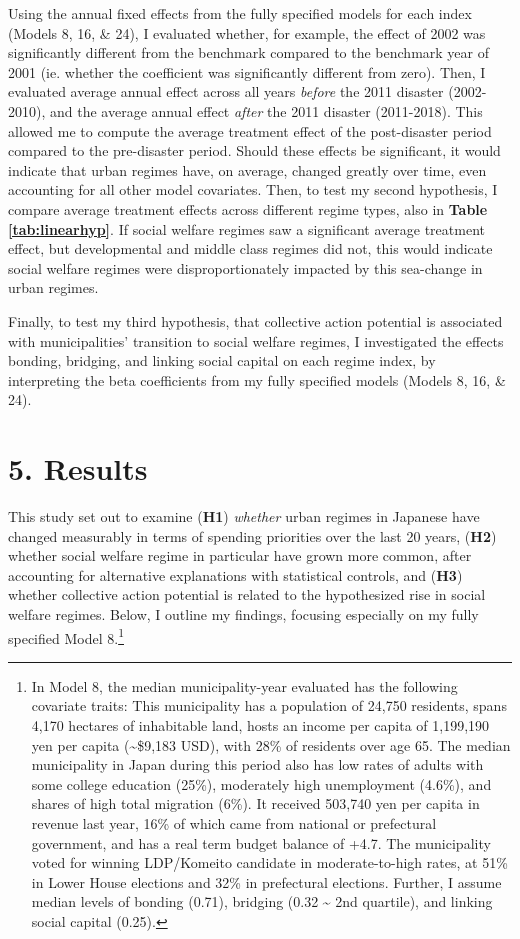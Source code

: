 \documentclass[preprint, 3p,
authoryear]{elsarticle} %
\begin{document}
Using the annual fixed effects from the fully specified models for each
index (Models 8, 16, \& 24), I evaluated whether, for example, the
effect of 2002 was significantly different from the benchmark compared
to the benchmark year of 2001 (ie. whether the coefficient was
significantly different from zero). Then, I evaluated average annual
effect across all years \emph{before} the 2011 disaster (2002-2010), and
the average annual effect \emph{after} the 2011 disaster (2011-2018).
This allowed me to compute the average treatment effect of the
post-disaster period compared to the pre-disaster period. Should these
effects be significant, it would indicate that urban regimes have, on
average, changed greatly over time, even accounting for all other model
covariates. Then, to test my second hypothesis, I compare average
treatment effects across different regime types, also in
\textbf{Table \ref{tab:linearhyp}}. If social welfare regimes saw a
significant average treatment effect, but developmental and middle class
regimes did not, this would indicate social welfare regimes were
disproportionately impacted by this sea-change in urban regimes.

Finally, to test my third hypothesis, that collective action potential
is associated with municipalities' transition to social welfare regimes,
I investigated the effects bonding, bridging, and linking social capital
on each regime index, by interpreting the beta coefficients from my
fully specified models (Models 8, 16, \& 24).

\hypertarget{results}{%
\section{5. Results}\label{results}}

This study set out to examine (\textbf{H1}) \emph{whether} urban regimes
in Japanese have changed measurably in terms of spending priorities over
the last 20 years, (\textbf{H2}) whether social welfare regime in
particular have grown more common, after accounting for alternative
explanations with statistical controls, and (\textbf{H3}) whether
collective action potential is related to the hypothesized rise in
social welfare regimes. Below, I outline my findings, focusing
especially on my fully specified Model 8.\footnote{In Model 8, the
  median municipality-year evaluated has the following covariate traits:
  This municipality has a population of 24,750 residents, spans 4,170
  hectares of inhabitable land, hosts an income per capita of 1,199,190
  yen per capita (\textasciitilde\$9,183 USD), with 28\% of residents
  over age 65. The median municipality in Japan during this period also
  has low rates of adults with some college education (25\%), moderately
  high unemployment (4.6\%), and shares of high total migration (6\%).
  It received 503,740 yen per capita in revenue last year, 16\% of which
  came from national or prefectural government, and has a real term
  budget balance of +4.7. The municipality voted for winning LDP/Komeito
  candidate in moderate-to-high rates, at 51\% in Lower House elections
  and 32\% in prefectural elections. Further, I assume median levels of
  bonding (0.71), bridging (0.32 \textasciitilde{} 2nd quartile), and
  linking social capital (0.25).}
\end{document}
